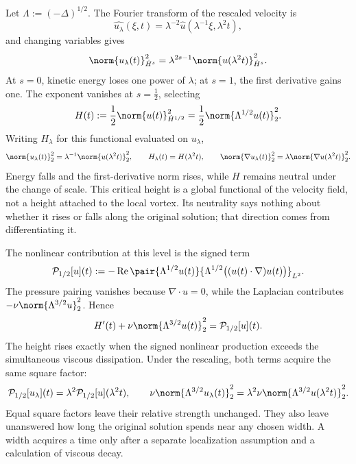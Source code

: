 Let \(\Lambda:=(-\Delta)^{1/2}\). The Fourier transform of the rescaled velocity is
\[
  \widehat{u_\lambda}(\xi,t)
  =
  \lambda^{-2}\widehat u(\lambda^{-1}\xi,\lambda^2t),
\]
and changing variables gives
\[
  \norm{u_\lambda(t)}_{\dot H^s}^2
  =
  \lambda^{2s-1}
  \norm{u(\lambda^2t)}_{\dot H^s}^2.
\]
At \(s=0\), kinetic energy loses one power of \(\lambda\); at \(s=1\), the first derivative gains one. The exponent vanishes at \(s=\tfrac12\), selecting
\[
  H(t)
  :=
  \frac12\norm{u(t)}_{\dot H^{1/2}}^2
  =
  \frac12\norm{\Lambda^{1/2}u(t)}_2^2.
\]
Writing \(H_\lambda\) for this functional evaluated on \(u_\lambda\),
\[
  \norm{u_\lambda(t)}_2^2
  =
  \lambda^{-1}\norm{u(\lambda^2t)}_2^2,
  \qquad
  H_\lambda(t)=H(\lambda^2t),
  \qquad
  \norm{\nabla u_\lambda(t)}_2^2
  =
  \lambda\norm{\nabla u(\lambda^2t)}_2^2.
\]
Energy falls and the first-derivative norm rises, while \(H\) remains neutral under the change of scale. This critical height is a global functional of the velocity field, not a height attached to the local vortex. Its neutrality says nothing about whether it rises or falls along the original solution; that direction comes from differentiating it.


The nonlinear contribution at this level is the signed term
\[
  \mathcal P_{1/2}[u](t)
  :=
  -\operatorname{Re}
  \pair
    {\Lambda^{1/2}u(t)}
    {\Lambda^{1/2}\bigl((u(t)\cdot\nabla)u(t)\bigr)}_{L^2}.
\]
The pressure pairing vanishes because \(\nabla\cdot u=0\), while the Laplacian contributes \(-\nu\norm{\Lambda^{3/2}u}_2^2\). Hence
\[
  H'(t)
  +
  \nu\norm{\Lambda^{3/2}u(t)}_2^2
  =
  \mathcal P_{1/2}[u](t).
\]
The height rises exactly when the signed nonlinear production exceeds the simultaneous viscous dissipation. Under the rescaling, both terms acquire the same square factor:
\[
  \mathcal P_{1/2}[u_\lambda](t)
  =
  \lambda^2\mathcal P_{1/2}[u](\lambda^2t),
  \qquad
  \nu\norm{\Lambda^{3/2}u_\lambda(t)}_2^2
  =
  \lambda^2\nu\norm{\Lambda^{3/2}u(\lambda^2t)}_2^2.
\]
Equal square factors leave their relative strength unchanged. They also leave unanswered how long the original solution spends near any chosen width. A width acquires a time only after a separate localization assumption and a calculation of viscous decay.


